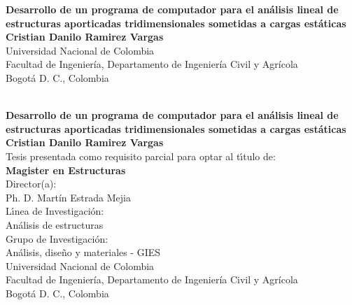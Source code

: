 \begin{center}
\begin{figure}
\centering%
%
\end{figure}
\thispagestyle{empty} \vspace*{2.0cm} \textbf{\huge
Desarrollo de un programa de computador para el análisis lineal de estructuras aporticadas tridimensionales sometidas a cargas estáticas}\\[4.5cm]
\Large\textbf{Cristian Danilo Ramirez Vargas}\\[4.5cm]
\small Universidad Nacional de Colombia\\
Facultad de Ingeniería, Departamento de Ingeniería Civil y Agrícola\\
Bogotá D. C., Colombia\\
\the\year\\
\end{center}

\newpage{\pagestyle{empty}\cleardoublepage}

\newpage
\begin{center}
\thispagestyle{empty} \vspace*{0cm} \textbf{\huge
Desarrollo de un programa de computador para el análisis lineal de estructuras aporticadas tridimensionales sometidas a cargas estáticas}\\[1.0cm]
\Large\textbf{Cristian Danilo Ramirez Vargas}\\[3.0cm]
\small Tesis presentada como requisito parcial para optar al
t\'{\i}tulo de:\\
\textbf{Magister en Estructuras}\\[2.5cm]
Director(a):\\
Ph. D. Martín Estrada Mejia\\[2.0cm]
L\'{\i}nea de Investigaci\'{o}n:\\
Análisis de estructuras\\
Grupo de Investigaci\'{o}n:\\
Análisis, diseño y materiales - GIES\\[2.5cm]
Universidad Nacional de Colombia\\
Facultad de Ingeniería, Departamento de Ingeniería Civil y Agrícola\\
Bogotá D. C., Colombia\\
\the\year\\
\end{center}

\newpage{\pagestyle{empty}\cleardoublepage}

